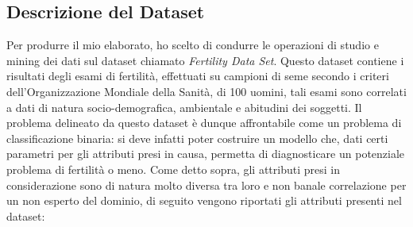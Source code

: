   \subsection{Descrizione del Dataset}
  Per produrre il mio elaborato, ho scelto di condurre le operazioni di studio e mining dei dati sul dataset chiamato \textit{Fertility Data Set}.
  Questo dataset contiene i risultati degli esami di fertilità, effettuati su campioni di seme secondo i criteri dell'Organizzazione Mondiale della Sanità, di 100 uomini, tali esami sono correlati a dati di natura socio-demografica, ambientale e abitudini dei soggetti.
  Il problema delineato da questo dataset è dunque affrontabile come un problema di classificazione binaria: si deve infatti poter costruire un modello che, dati certi parametri per gli attributi presi in causa, permetta di diagnosticare un potenziale problema di fertilità o meno.
  Come detto sopra, gli attributi presi in considerazione sono di natura molto diversa tra loro e non banale correlazione per un non esperto del dominio, di seguito vengono riportati gli attributi presenti nel dataset:
